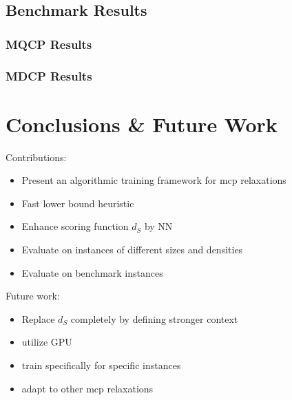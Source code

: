 \documentclass[draft,final]{vutinfth} %
\begin{document}
\section{Benchmark Results}

\subsection{MQCP Results}
\subsection{MDCP Results}





\chapter{Conclusions \& Future Work}\label{chp:conclusions}

Contributions:
\begin{itemize}
    \item Present an algorithmic training framework for mcp relaxations
    \item Fast lower bound heuristic
    \item Enhance scoring function $d_S$ by NN 
    \item Evaluate on instances of different sizes and densities
    \item Evaluate on benchmark instances
\end{itemize}

Future work:
\begin{itemize}
    \item Replace $d_S$ completely by defining stronger context
    \item utilize GPU
    \item train specifically for specific instances
    \item adapt to other mcp relaxations
\end{itemize}

\backmatter

\listoffigures %

\cleardoublepage %
\listoftables %

\listofalgorithms
{}

\printindex

\printglossaries



\end{document}
